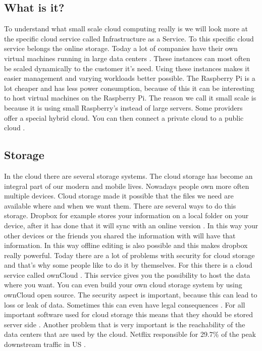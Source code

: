 \documentclass{sig-alternate-br}
\begin{document}
\subsection{What is it?}
To understand what small scale cloud computing really is we will look more at the specific cloud service called Infrastructure as a Service. To this specific cloud service belongs the online storage. Today a lot of companies have their own virtual machines running in large data centers \cite{beloglazov:2010}. These instances can most often be scaled dynamically to the customer it's need. Using these instances makes it easier management and varying workloads better possible. The Raspberry Pi is a lot cheaper and has less power consumption, because of this it can be interesting 
to host virtual machines on the Raspberry Pi. The reason we call it small scale is because it is using small Raspberry's instead of large servers. Some providers offer a special hybrid cloud. You can then connect a private cloud to a public cloud \cite{qian:2009}. 


\subsection{Storage}
In the cloud there are several storage systems.  The cloud storage has become an integral part of our modern and mobile lives. Nowadays people own more often multiple devices. Cloud storage made it possible that the files we need are available where and when we want them. There are several ways to do this storage. Dropbox for example stores your information on a local folder on your device, after it has done that it will sync with an online version \cite{drago2012inside, dropbox}. In this way your other devices or the friends you shared the information with will have that information. In this way offline editing is also possible and this makes dropbox really powerful. \newline
Today there are a lot of problems with security for cloud storage and that's why some people like to do it by themselves. For this there is a cloud service called ownCloud \cite{owncloud}. This service gives you the possibility to host the data where you want. You can even build your own cloud storage system by using ownCloud open source. The security aspect is important, because this can lead to loss or leak of data. Sometimes this can even have legal consequences \cite{hofer:2011}. For all important software used for cloud storage this means that they should be stored server side \cite{hofer:2011}. \newline
Another problem that is very important is the reachability of the data centers that are used by the cloud. Netflix responsible for 29.7\% of the peak downstream traffic in US  \cite{Adhikari:2012}.
\end{document}
